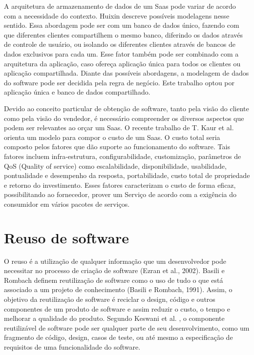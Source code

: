 A arquitetura de armazenamento de dados de um Saas pode variar de acordo com a necessidade do contexto. Huixin \cite{7586486} descreve possíveis modelagens nesse sentido. Essa abordagem pode ser com um banco de dados único, fazendo com que diferentes clientes compartilhem o mesmo banco, diferindo os dados através de controle de usuário, ou isolando os diferentes clientes através de bancos de dados exclusivos para cada um. Esse fator também pode ser combinado com a arquitetura da aplicação, caso ofereça aplicação única para todos os clientes ou aplicação compartilhada. Diante das possíveis abordagens, a modelagem de dados do software pode ser decidida pela regra de negócio. Este trabalho optou por aplicação única e banco de dados compartilhado.

Devido ao conceito particular de obtenção de software, tanto pela visão do cliente como pela visão do vendedor, é necessário compreender os diversos aspectos que podem ser relevantes ao orçar um Saas. O recente trabalho de T. Kaur et al. \citep{6949281} orienta um modelo para compor o custo de um Saas. O custo total seria composto pelos fatores que dão suporte ao funcionamento do software. Tais fatores incluem infra-estrutura, configurabilidade, customização, parâmetros de QoS (Quality of service) como escalabilidade, disponibilidade, usabilidade, pontualidade e desempenho da resposta, portabilidade, custo total de propriedade e retorno do investimento. Esses fatores caracterizam o custo de forma eficaz, possibilitando ao fornecedor, prover um Serviço de acordo com a exigência do consumidor em vários pacotes de serviços.


\section{Reuso de software}\label{sec:reuso} %


O reuso é a utilização de qualquer informação que um desenvolvedor pode necessitar no processo de criação de software (Ezran et al., 2002). Basili e Rombach definem reutilização de software como o uso de tudo o que está associado a um projeto de conhecimento (Basili e Rombach, 1991).
Assim, o objetivo da reutilização de software é reciclar o design, código e outros componentes de um produto de software e assim reduzir o custo, o tempo e melhorar a qualidade do produto.
Segundo Keswani et al. \cite{6783445}, o componente reutilizável de software pode ser qualquer parte de seu desenvolvimento, como um fragmento de código, design, casos de teste, ou até mesmo a especificação de requisitos de uma funcionalidade do software. 

